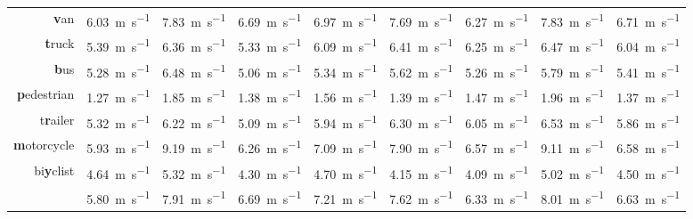 \documentclass[a4paper, 10pt, conference]{ieeeconf}      %
\begin{document}
\begin{table}[t]
\begin{center}
\begin{tabular}{r|r|r|r|r|r|r|r||r}
                \textbf{v}an & \SI{6,03}{\meter\per\second} & \SI{7,83}{\meter\per\second} & \SI{6,69}{\meter\per\second} & \SI{6,97}{\meter\per\second} & \SI{7,69}{\meter\per\second} & \SI{6,27}{\meter\per\second} & \SI{7,83}{\meter\per\second} & \SI{6,71}{\meter\per\second} \\
            \textbf{t}ruck & \SI{5,39}{\meter\per\second} & \SI{6,36}{\meter\per\second} & \SI{5,33}{\meter\per\second} & \SI{6,09}{\meter\per\second} & \SI{6,41}{\meter\per\second} & \SI{6,25}{\meter\per\second} & \SI{6,47}{\meter\per\second} & \SI{6,04}{\meter\per\second} \\
                \textbf{b}us & \SI{5,28}{\meter\per\second} & \SI{6,48}{\meter\per\second} & \SI{5,06}{\meter\per\second} & \SI{5,34}{\meter\per\second} & \SI{5,62}{\meter\per\second} & \SI{5,26}{\meter\per\second} & \SI{5,79}{\meter\per\second} & \SI{5,41}{\meter\per\second} \\
        \textbf{p}edestrian & \SI{1,27}{\meter\per\second} & \SI{1,85}{\meter\per\second} & \SI{1,38}{\meter\per\second} & \SI{1,56}{\meter\per\second} & \SI{1,39}{\meter\per\second} & \SI{1,47}{\meter\per\second} & \SI{1,96}{\meter\per\second} & \SI{1,37}{\meter\per\second} \\
        t\textbf{r}ailer & \SI{5,32}{\meter\per\second} & \SI{6,22}{\meter\per\second} & \SI{5,09}{\meter\per\second} & \SI{5,94}{\meter\per\second} & \SI{6,30}{\meter\per\second} & \SI{6,05}{\meter\per\second} & \SI{6,53}{\meter\per\second} & \SI{5,86}{\meter\per\second} \\
        \textbf{m}otorcycle & \SI{5,93}{\meter\per\second} & \SI{9,19}{\meter\per\second} & \SI{6,26}{\meter\per\second} & \SI{7,09}{\meter\per\second} & \SI{7,90}{\meter\per\second} & \SI{6,57}{\meter\per\second} & \SI{9,11}{\meter\per\second} & \SI{6,58}{\meter\per\second} \\
        bi\textbf{y}clist & \SI{4,64}{\meter\per\second} & \SI{5,32}{\meter\per\second} & \SI{4,30}{\meter\per\second} & \SI{4,70}{\meter\per\second} & \SI{4,15}{\meter\per\second} & \SI{4,09}{\meter\per\second} & \SI{5,02}{\meter\per\second} & \SI{4,50}{\meter\per\second} \\
    \hline
                    & \SI{5,80}{\meter\per\second} & \SI{7,91}{\meter\per\second} & \SI{6,69}{\meter\per\second} & \SI{7,21}{\meter\per\second} & \SI{7,62}{\meter\per\second} & \SI{6,33}{\meter\per\second} & \SI{8,01}{\meter\per\second} & \SI{6,63}{\meter\per\second} \\
                    \hline
                    \hline

\end{tabular}
\end{center}
\end{table}
\end{document}
